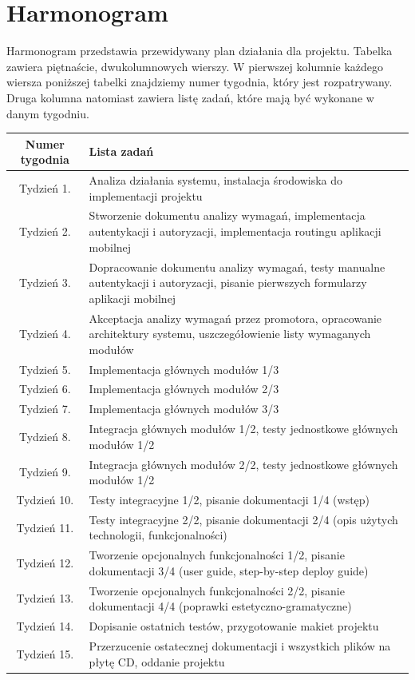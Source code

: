 \documentclass{article}
\begin{document}
\section{Harmonogram}

Harmonogram przedstawia przewidywany plan działania dla projektu. Tabelka zawiera piętnaście, dwukolumnowych wierszy. W pierwszej kolumnie każdego wiersza poniższej tabelki znajdziemy numer tygodnia, który jest rozpatrywany. Druga kolumna natomiast zawiera listę zadań, które mają być wykonane w danym tygodniu.

\begin{center}
	\begin{tabular}{|c|L|}
	\hline
	Numer tygodnia & Lista zadań \\
	\hline
	Tydzień 1. & Analiza działania systemu, instalacja środowiska do implementacji projektu\\
	\hline
	Tydzień 2. & Stworzenie dokumentu analizy wymagań, implementacja autentykacji i autoryzacji, implementacja routingu aplikacji mobilnej\\
	\hline
	Tydzień 3. & Dopracowanie dokumentu analizy wymagań, testy manualne autentykacji i autoryzacji, pisanie pierwszych formularzy aplikacji mobilnej\\
	\hline
	Tydzień 4. & Akceptacja analizy wymagań przez promotora, opracowanie architektury systemu, uszczegółowienie listy wymaganych modułów \\
	\hline
	Tydzień 5. & Implementacja głównych modułów 1/3 \\
	\hline
	Tydzień 6. & Implementacja głównych modułów 2/3 \\
	\hline
	Tydzień 7. & Implementacja głównych modułów 3/3 \\
	\hline
	Tydzień 8. & Integracja głównych modułów 1/2, testy jednostkowe głównych modułów 1/2 \\
	\hline
	Tydzień 9. & Integracja głównych modułów 2/2, testy jednostkowe głównych modułów 1/2 \\
	\hline
	Tydzień 10. & Testy integracyjne 1/2, pisanie dokumentacji 1/4 (wstęp) \\
	\hline
	Tydzień 11. & Testy integracyjne 2/2, pisanie dokumentacji 2/4 (opis użytych technologii, funkcjonalności) \\
	\hline
	Tydzień 12. & Tworzenie opcjonalnych funkcjonalności 1/2, pisanie dokumentacji 3/4 (user guide, step-by-step deploy guide) \\
	\hline
	Tydzień 13. & Tworzenie opcjonalnych funkcjonalności 2/2, pisanie dokumentacji 4/4 (poprawki estetyczno-gramatyczne) \\
	\hline
	Tydzień 14. & Dopisanie ostatnich testów, przygotowanie makiet projektu \\
	\hline
	Tydzień 15. & Przerzucenie ostatecznej dokumentacji i wszystkich plików na płytę CD, oddanie projektu \\
	\hline
	\end{tabular}
\end{center}
\end{document}
